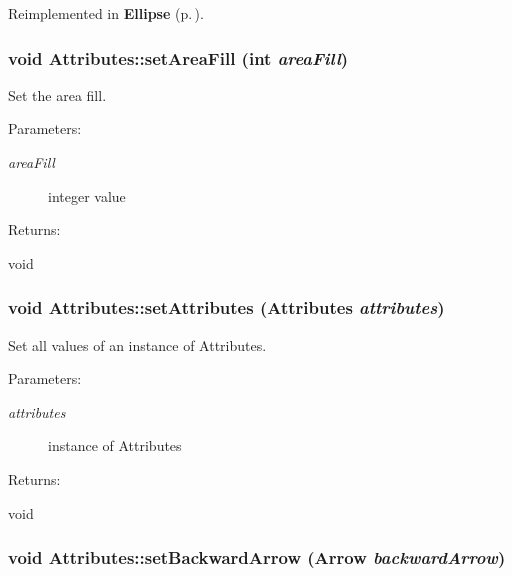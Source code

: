 Reimplemented in {\bf Ellipse} {\rm (p.\,\pageref{classEllipse_a3})}.
\subsubsection{\setlength{\rightskip}{0pt plus 5cm}void Attributes::set\-Area\-Fill (int {\em area\-Fill})\hspace{0.3cm}{\tt  [inline]}}\label{classAttributes_a8}


Set the area fill. \begin{Desc}
\item[Parameters: ]\par
\begin{description}
\item[{\em 
area\-Fill}]integer value \end{description}
\end{Desc}
\begin{Desc}
\item[Returns: ]\par
void \end{Desc}
\subsubsection{\setlength{\rightskip}{0pt plus 5cm}void Attributes::set\-Attributes (Attributes {\em attributes})}\label{classAttributes_a23}


Set all values of an instance of Attributes. \begin{Desc}
\item[Parameters: ]\par
\begin{description}
\item[{\em 
attributes}]instance of Attributes \end{description}
\end{Desc}
\begin{Desc}
\item[Returns: ]\par
void \end{Desc}
\subsubsection{\setlength{\rightskip}{0pt plus 5cm}void Attributes::set\-Backward\-Arrow ({\bf Arrow} {\em backward\-Arrow})\hspace{0.3cm}{\tt  [inline]}}\label{classAttributes_a16}


